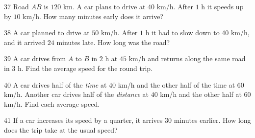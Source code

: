 \gap
\begin{probbox}{37}{}
Road $AB$ is $120$ km. A car plans to drive at $40$ km/h. After $1$ h it speeds up by $10$ km/h. How many minutes early does it arrive?
\end{probbox}
\gap
\begin{probbox}{38}{}
A car planned to drive at $50$ km/h. After $1$ h it had to slow down to $40$ km/h, and it arrived $24$ minutes late. How long was the road?
\end{probbox}
\gap
\begin{probbox}{39}{}
A car drives from $A$ to $B$ in $2$ h at $45$ km/h and returns along the same road in $3$ h. Find the average speed for the round trip.
\end{probbox}
\gap
\begin{probbox}{40}{}
 A car drives half of the \emph{time} at $40$ km/h and the other half of the time at $60$ km/h.  Another car drives half of the \emph{distance} at $40$ km/h and the other half at $60$ km/h. Find each average speed.
\end{probbox}
\gap
\begin{probbox}{41}{}
If a car increases its speed by a quarter, it arrives $30$ minutes earlier. How long does the trip take at the usual speed?
\end{probbox}
